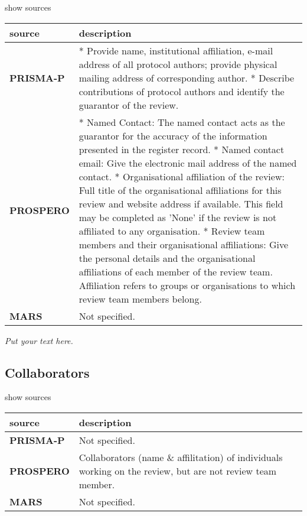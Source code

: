 \documentclass[]{article}
\begin{document}
show sources

\hypertarget{nac}{}
\begin{table}[H]
\centering
\begin{tabular}{>{\bfseries}l|l}
\hline
\rowcolor[HTML]{ececec}  source & description\\
\hline
PRISMA-P & * Provide name, institutional affiliation, e-mail address of all protocol authors; provide physical mailing address of corresponding author.
* Describe contributions of protocol authors and identify the guarantor of the review.\\
\hline
PROSPERO & * Named Contact: The named contact acts as the guarantor for the accuracy of the information presented in the register record.
* Named contact email: Give the electronic mail address of the named contact.
* Organisational affiliation of the review: Full title of the organisational affiliations for this review and website address if available. This field may be completed as 'None' if the review is not affiliated to any organisation.
* Review team members and their organisational affiliations: Give the personal details and the organisational affiliations of each member of the review team. Affiliation refers to groups or organisations to which review team members belong.\\
\hline
MARS & Not specified.\\
\hline
\end{tabular}
\end{table}

\emph{Put your text here.}

\hypertarget{collaborators}{%
\subsection{Collaborators}\label{collaborators}}

show sources

\hypertarget{colla}{}
\begin{table}[H]
\centering
\begin{tabular}{>{\bfseries}l|l}
\hline
\rowcolor[HTML]{ececec}  source & description\\
\hline
PRISMA-P & Not specified.\\
\hline
PROSPERO & Collaborators (name \& affilitation) of individuals working on the review, but are not review team member.\\
\hline
MARS & Not specified.\\
\hline
\end{tabular}
\end{table}
\end{document}
